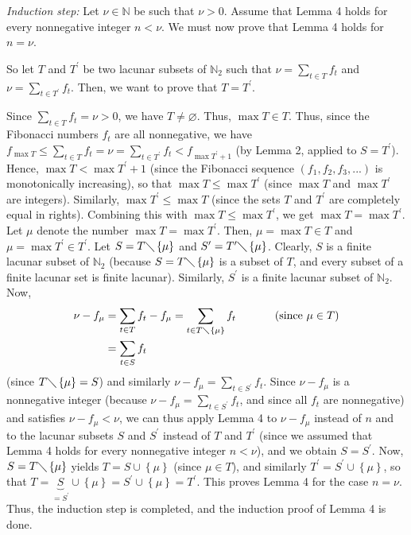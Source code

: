 \documentclass[12pt,final,notitlepage,onecolumn]{article}%
\begin{document}
\textit{Induction step:} Let $\nu\in\mathbb{N}$ be such that $\nu>0$. Assume
that Lemma 4 holds for every nonnegative integer $n<\nu$. We must now prove
that Lemma 4 holds for $n=\nu$.

So let $T$ and $T^{\prime}$ be two lacunar subsets of $\mathbb{N}_{2}$ such that
$\nu=\sum\limits_{t\in T}f_{t}$ and $\nu=\sum\limits_{t\in T^{\prime}}f_{t}$.
Then, we want to prove that $T=T^{\prime}$.

Since $\sum\limits_{t\in T}f_{t}=\nu>0$, we have $T\neq\varnothing$. Thus,
$\max T\in T$. Thus, since the Fibonacci numbers $f_{t}$ are all nonnegative,
we have $f_{\max T}\leq\sum\limits_{t\in T}f_{t}=\nu=\sum\limits_{t\in
T^{\prime}}f_{t}<f_{\max T^{\prime}+1}$ (by Lemma 2, applied to $S=T^{\prime}%
$). Hence, $\max T<\max T^{\prime}+1$ (since the Fibonacci sequence $\left(
f_{1},f_{2},f_{3},...\right)  $ is monotonically increasing), so that $\max
T\leq\max T^{\prime}$ (since $\max T$ and $\max T^{\prime}$ are integers).
Similarly, $\max T^{\prime}\leq\max T$ (since the sets $T$ and $T^{\prime}$
are completely equal in rights). Combining this with $\max T\leq\max
T^{\prime}$, we get $\max T=\max T^{\prime}$. Let $\mu$ denote the number
$\max T=\max T^{\prime}$. Then, $\mu=\max T\in T$ and $\mu=\max T^{\prime}\in
T^{\prime}$. Let $S=T\diagdown\left\{  \mu\right\}  $ and $S^{\prime
}=T^{\prime}\diagdown\left\{  \mu\right\}  $. Clearly, $S$ is a finite lacunar
subset of $\mathbb{N}_{2}$ (because $S=T\diagdown\left\{  \mu\right\}  $ is a
subset of $T$, and every subset of a finite lacunar set is finite lacunar).
Similarly, $S^{\prime}$ is a finite lacunar subset of $\mathbb{N}_{2}$. Now,%
\begin{align*}
\nu-f_{\mu}  &  =\sum\limits_{t\in T}f_{t}-f_{\mu}=\sum\limits_{t\in
T\diagdown\left\{  \mu\right\}  }f_{t}\ \ \ \ \ \ \ \ \ \ \left(  \text{since
}\mu\in T\right) \\
&  =\sum\limits_{t\in S}f_{t}%
\end{align*}
(since $T\diagdown\left\{  \mu\right\}  =S$) and similarly $\nu-f_{\mu}%
=\sum\limits_{t\in S^{\prime}}f_{t}$. Since $\nu-f_{\mu}$ is a nonnegative
integer (because $\nu-f_{\mu}=\sum\limits_{t\in S^{\prime}}f_{t}$, and since
all $f_{t}$ are nonnegative) and satisfies $\nu-f_{\mu}<\nu$, we can thus
apply Lemma 4 to $\nu-f_{\mu}$ instead of $n$ and to the lacunar subsets $S$ and
$S^{\prime}$ instead of $T$ and $T^{\prime}$ (since we assumed that Lemma 4
holds for every nonnegative integer $n<\nu$), and we obtain $S=S^{\prime}$.
Now, $S=T\diagdown\left\{  \mu\right\}  $ yields $T=S\cup\left\{  \mu\right\}
$ (since $\mu\in T$), and similarly $T^{\prime}=S^{\prime}\cup\left\{
\mu\right\}  $, so that $T=\underbrace{S}_{=S^{\prime}}\cup\left\{
\mu\right\}  =S^{\prime}\cup\left\{  \mu\right\}  =T^{\prime}$. This proves
Lemma 4 for the case $n=\nu$. Thus, the induction step is completed, and the
induction proof of Lemma 4 is done.
\end{document}
